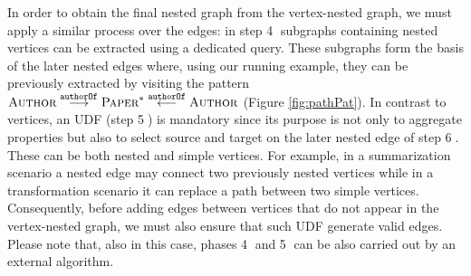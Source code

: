 %
In order to obtain the final nested graph from the vertex-nested graph, we must apply a similar process over the edges: in step \textcircled{\raisebox{-.5pt}4} subgraphs containing nested vertices can be extracted using a dedicated query. These subgraphs form the basis of the later nested edges where, using our running example, they can be previously extracted by visiting the pattern $\textsc{Author}\overset{\texttt{authorOf}}{\longrightarrow}\textsc{Paper}^*\overset{\texttt{authorOf}}{\longleftarrow} \textsc{Author}$ (Figure \ref{fig:pathPat}). In contrast to vertices, an UDF (step \textcircled{\raisebox{-.5pt}5}) is mandatory since its purpose is not only to aggregate properties but also to select source and target on the later nested edge of step \textcircled{\raisebox{-.5pt}6}. These can be both nested and simple vertices. For example, in a summarization scenario a nested edge may connect two previously nested vertices while in a transformation scenario it can replace a path between two simple vertices. Consequently, before adding edges between vertices that do not appear in the vertex-nested graph, we must also ensure that such UDF generate valid edges. Please note that, also in this case, phases \textcircled{\raisebox{-.5pt}4} and \textcircled{\raisebox{-.5pt}5} can be also carried out by an external algorithm.
%
%
%

